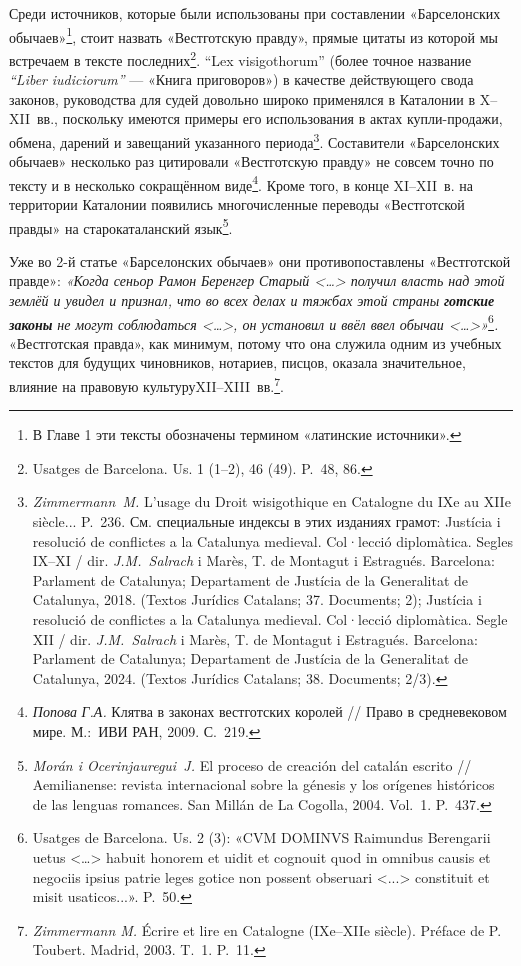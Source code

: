 Среди источников, которые были использованы при составлении «Барселонских обычаев»\footnote{В Главе 1 эти тексты обозначены термином «латинские источники».}, стоит назвать «Вестготскую правду», прямые цитаты из которой мы встречаем в тексте последних\footnote{Usatges de Barcelona. Us. 1 (1--2), 46 (49). P.~48, 86.}. “Lex visigothorum” (более точное название \emph{“}\emph{Liber}\emph{ }\emph{iudiciorum}\emph{”} --- «Книга приговоров») в качестве действующего свода законов, руководства для судей довольно широко применялся в Каталонии в X--XII~вв., поскольку имеются примеры его использования в актах купли-продажи, обмена, дарений и завещаний\emph{ }указанного периода\footnote{\emph{Zimmermann~M. }L'usage du Droit wisigothique en Catalogne du IXe au XIIe siècle... P.~236. См. специальные индексы в этих изданиях грамот: Justícia i resolució de conflictes a la Catalunya medieval. Col·lecció diplomàtica. Segles IX--XI / dir. \emph{J.M.~Salrach} i Marès, T. de Montagut i Estragués. Barcelona: Parlament de Catalunya; Departament de Justícia de la Generalitat de Catalunya, 2018. (Textos Jurídics Catalans; 37. Documents; 2); Justícia i resolució de conflictes a la Catalunya medieval. Col·lecció diplomàtica. Segle XII / dir. \emph{J.M.~Salrach} i Marès, T. de Montagut i Estragués. Barcelona: Parlament de Catalunya; Departament de Justícia de la Generalitat de Catalunya, 2024. (Textos Jurídics Catalans; 38. Documents; 2/3).}. Составители «Барселонских обычаев» несколько раз цитировали «Вестготскую правду» не совсем точно по тексту и в несколько сокращённом виде\footnote{\emph{Попова}\emph{ }\emph{Г}\emph{.}\emph{А}\emph{. }Клятва в законах вестготских королей // Право в средневековом мире. М.:~ИВИ РАН, 2009. С.~219.}. Кроме того, в конце XI--XII~в. на территории Каталонии появились многочисленные переводы «Вестготской правды» на старокаталанский язык\footnote{\emph{Morán i Ocerinjauregui~J. }El proceso de creación del catalán escrito // Aemilianense: revista internacional sobre la génesis y los orígenes históricos de las lenguas romances. San Millán de La Cogolla, 2004. Vol.~1. P.~437.}.

Уже во 2-й статье «Барселонских обычаев» они противопоставлены «Вестготской правде»: \emph{«Когда сеньор Рамон }\emph{Беренгер}\emph{ Старый <…> получил власть над этой землёй и увидел и признал, что во всех делах и тяжбах этой страны }\textbf{\emph{готские законы}}\emph{ не могут соблюдаться <…>, он установил и ввёл ввел обычаи <…>»}\footnote{Usatges de Barcelona. Us. 2 (3): «CVM DOMINVS Raimundus Berengarii uetus <…> habuit honorem et uidit et cognouit quod in omnibus causis et negociis ipsius patrie leges gotice non possent obseruari <...> constituit et misit usaticos...». P.~50.}\emph{. }«Вестготская правда», как минимум, потому что она служила одним из учебных текстов для будущих чиновников, нотариев, писцов, оказала значительное, влияние на правовую культуруXII--XIII~вв.\footnote{\emph{Zimmermann M. }Écrire et lire en Catalogne (IXe--XIIe siècle). Préface de P. Toubert. Madrid, 2003. T.~1. P.~11.}.

